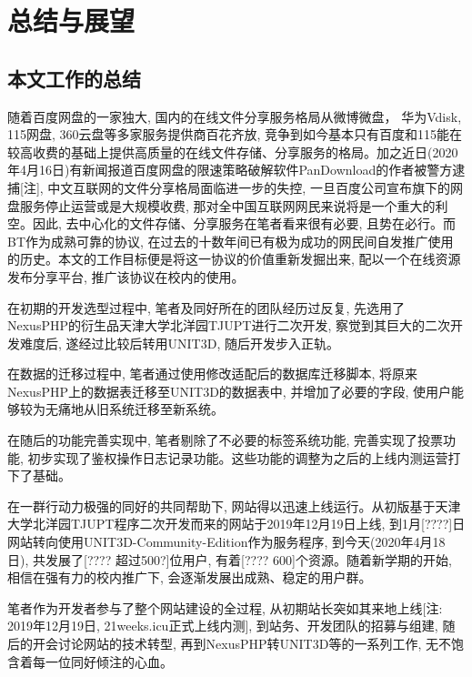 
\chapter{总结与展望}


\section{本文工作的总结}

随着百度网盘的一家独大, 国内的在线文件分享服务格局从微博微盘， 华为Vdisk, 115网盘, 360云盘等多家服务提供商百花齐放, 竞争到如今基本只有百度和115能在较高收费的基础上提供高质量的在线文件存储、分享服务的格局。加之近日(2020年4月16日)有新闻报道百度网盘的限速策略破解软件PanDownload的作者被警方逮捕[注], 中文互联网的文件分享格局面临进一步的失控, 一旦百度公司宣布旗下的网盘服务停止运营或是大规模收费, 那对全中国互联网网民来说将是一个重大的利空。因此, 去中心化的文件存储、分享服务在笔者看来很有必要, 且势在必行。而BT作为成熟可靠的协议, 在过去的十数年间已有极为成功的网民间自发推广使用的历史。本文的工作目标便是将这一协议的价值重新发掘出来, 配以一个在线资源发布分享平台, 推广该协议在校内的使用。

在初期的开发选型过程中, 笔者及同好所在的团队经历过反复, 先选用了NexusPHP的衍生品天津大学北洋园TJUPT进行二次开发, 察觉到其巨大的二次开发难度后, 遂经过比较后转用UNIT3D, 随后开发步入正轨。

在数据的迁移过程中, 笔者通过使用修改适配后的数据库迁移脚本, 将原来NexusPHP上的数据表迁移至UNIT3D的数据表中, 并增加了必要的字段, 使用户能够较为无痛地从旧系统迁移至新系统。

在随后的功能完善实现中, 笔者剔除了不必要的标签系统功能, 完善实现了投票功能, 初步实现了鉴权操作日志记录功能。这些功能的调整为之后的上线内测运营打下了基础。

在一群行动力极强的同好的共同帮助下, 网站得以迅速上线运行。从初版基于天津大学北洋园TJUPT程序二次开发而来的网站于2019年12月19日上线, 到1月[????]日网站转向使用UNIT3D-Community-Edition作为服务程序, 到今天(2020年4月18日), 共发展了[???? 超过500?]位用户, 有着[???? 600]个资源。随着新学期的开始, 相信在强有力的校内推广下, 会逐渐发展出成熟、稳定的用户群。

笔者作为开发者参与了整个网站建设的全过程, 从初期站长突如其来地上线[注: 2019年12月19日, 21weeks.icu正式上线内测], 到站务、开发团队的招募与组建, 随后的开会讨论网站的技术转型, 再到NexusPHP转UNIT3D等的一系列工作, 无不饱含着每一位同好倾注的心血。

